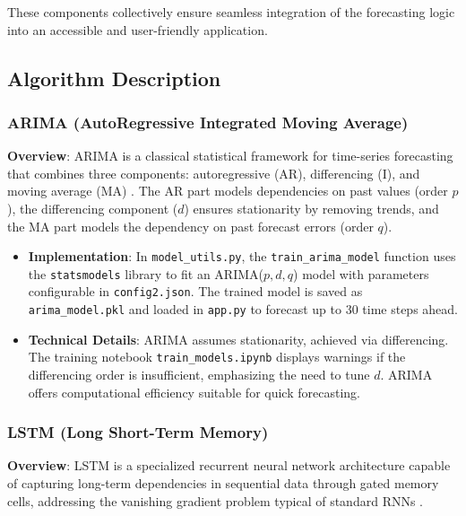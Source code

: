 These components collectively ensure seamless integration of the forecasting logic into an accessible and user-friendly application.



\subsection{Algorithm Description}

\subsubsection{ARIMA (AutoRegressive Integrated Moving Average)}

\textbf{Overview}: ARIMA is a classical statistical framework for time-series forecasting that combines three components: autoregressive (AR), differencing (I), and moving average (MA) \cite{BoxEtAl2015}. The AR part models dependencies on past values (order $p$), the differencing component ($d$) ensures stationarity by removing trends, and the MA part models the dependency on past forecast errors (order $q$).

\begin{itemize}
	\item \textbf{Implementation}: In \texttt{model\_utils.py}, the \texttt{train\_arima\_model} function uses the \texttt{statsmodels} library to fit an ARIMA($p,d,q$) model with parameters configurable in \texttt{config2.json}. The trained model is saved as \texttt{arima\_model.pkl} and loaded in \texttt{app.py} to forecast up to 30 time steps ahead.
	\item \textbf{Technical Details}: ARIMA assumes stationarity, achieved via differencing. The training notebook \texttt{train\_models.ipynb} displays warnings if the differencing order is insufficient, emphasizing the need to tune $d$. ARIMA offers computational efficiency suitable for quick forecasting.
\end{itemize}

\subsubsection{LSTM (Long Short-Term Memory)}

\textbf{Overview}: LSTM is a specialized recurrent neural network architecture capable of capturing long-term dependencies in sequential data through gated memory cells, addressing the vanishing gradient problem typical of standard RNNs \cite{HochreiterSchmidhuber1997}.

